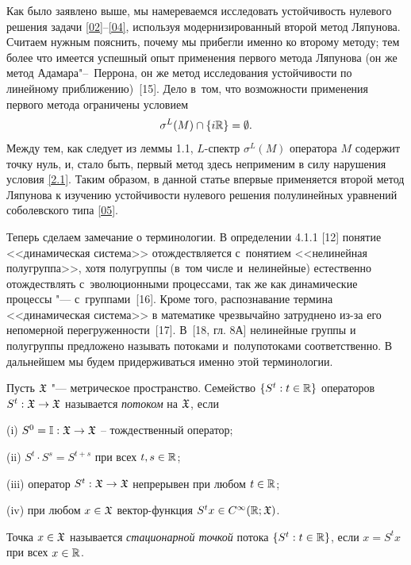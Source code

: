 \smallskip

Как было заявлено выше, мы намереваемся исследовать устойчивость нулевого решения  задачи \eqref{02}--\eqref{04}, используя модернизированный второй метод Ляпунова. 
Считаем нужным пояснить, почему мы прибегли именно ко второму методу; тем более что имеется успешный опыт применения первого метода Ляпунова (он же метод Адамара"--~Перрона, он же метод исследования устойчивости по линейному приближению)~[15]. 
Дело в~том, что возможности применения первого метода ограничены условием 
\begin{equation}\sigma^L (M)\cap \{i{\Bbb R}\}=\emptyset.\label{2.1}
\end{equation} 
Между тем, как следует из леммы 1.1, $L$-спектр $\sigma^L (M)$ оператора $M$ содержит точку нуль, и, стало быть, первый метод здесь неприменим в силу нарушения условия \eqref{2.1}. 
Таким образом,  в данной статье  впервые применяется второй метод Ляпунова к изучению устойчивости нулевого решения полулинейных уравнений соболевского типа \eqref{05}.

Теперь сделаем замечание о терминологии. В определении 4.1.1 [12] понятие <<динамическая система>> отождествляется с~понятием <<нелинейная полугруппа>>, хотя полугруппы (в~том числе и~нелинейные) естественно отождествлять с~эволюционными процессами, так же как динамические процессы "---  с~группами~[16]. 
Кроме того, распознавание термина <<динамическая система>> в математике чрезвычайно затруднено из-за его непомерной перегруженности~[17]. 
В~[18, гл. 8А]  нелинейные группы и полугруппы предложено называть потоками и~полупотоками соответственно. 
В дальнейшем мы будем придерживаться именно этой терминологии.

\smallskip

\begin{definition}[2.1] Пусть $\frak X$ "--- метрическое пространство. 
Семейство $\{S^t: t\in\Bbb R\}$ операторов $S^t:\frak X\to\frak X$  называется {\it потоком} на $\frak X$, если

(i) $S^0={\Bbb I}:\frak X\to \frak X$ -- тождественный оператор;

(ii) $S^t\cdot S^s=S^{t+s}$ при всех $t, s\in \Bbb R$;

(iii) оператор $S^t:\frak X\to\frak X$ непрерывен при любом $t\in \Bbb R$;

(iv) при любом $x\in\frak X$ вектор-функция $S^t x\in C^\infty ({\Bbb R}; \frak X)$.

Точка $x\in \frak X$ называется {\it стационарной точкой} потока $\{S^t: t\in \Bbb R\}$, если $x=S^tx$ при всех $x\in\Bbb R$.     \end{definition}

